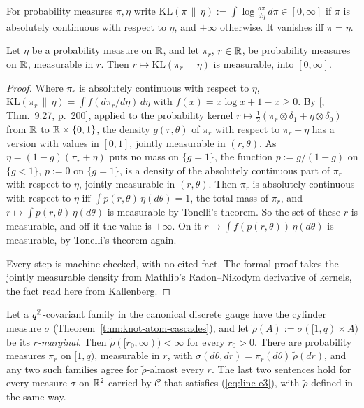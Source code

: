 For probability measures
$\pi, \eta$ write $\mathrm{KL}(\pi \,\|\, \eta) := \int\log\frac{d\pi}{d\eta}\,d\pi \in [0,\infty]$
if $\pi$ is absolutely continuous with respect to $\eta$, and $+\infty$ otherwise. It vanishes iff
$\pi = \eta$.

\begin{lemma}
\label{lem:kl-measurable}

Let $\eta$ be a probability measure on $\mathbb{R}$, and let $\pi_r$, $r \in \mathbb{R}$, be probability measures
on $\mathbb{R}$, measurable in $r$. Then $r \mapsto \mathrm{KL}(\pi_r \,\|\, \eta)$ is measurable, into
$[0,\infty]$.
\end{lemma}

\begin{proof}
Where $\pi_r$ is absolutely continuous with respect to $\eta$,
$\mathrm{KL}(\pi_r \,\|\, \eta) = \int f(d\pi_r/d\eta)\,d\eta$ with $f(x) = x\log x + 1 - x \ge 0$.
By [, Thm.~9.27, p.~200], applied to the probability kernel
$r \mapsto \tfrac12(\pi_r \otimes \delta_1 + \eta \otimes \delta_0)$ from $\mathbb{R}$ to
$\mathbb{R} \times \{0, 1\}$, the density $g(r, \theta)$ of $\pi_r$ with respect to $\pi_r + \eta$ has a
version with values in $[0, 1]$, jointly measurable in $(r, \theta)$. As
$\eta = (1 - g)(\pi_r + \eta)$ puts no mass on $\{g = 1\}$, the function $p := g/(1 - g)$ on
$\{g < 1\}$, $p := 0$ on $\{g = 1\}$, is a density of the absolutely continuous part of $\pi_r$
with respect to $\eta$, jointly measurable in $(r, \theta)$. Then $\pi_r$ is absolutely continuous with respect
to $\eta$ iff $\int p(r, \theta)\,\eta(d\theta) = 1$, the total mass of $\pi_r$, and
$r \mapsto \int p(r, \theta)\,\eta(d\theta)$ is measurable by Tonelli's theorem. So the set of these
$r$ is measurable, and off it the value is $+\infty$. On it $r \mapsto \int f(p(r, \theta))\,
\eta(d\theta)$ is measurable, by Tonelli's theorem again.

Every step is machine-checked, with no cited fact. The formal proof takes the jointly measurable
density from Mathlib's Radon--Nikodym derivative of kernels, the fact read here from Kallenberg.
\end{proof}

\begin{lemma}
\label{lem:phase-disintegration-exists}

Let a $q^{\mathbb{Z}}$-covariant family in the canonical discrete gauge have the cylinder measure $\sigma$
(Theorem~\ref{thm:knot-atom-cascades}), and let $\tilde\rho(A) := \sigma([1,q) \times A)$ be its
\emph{$r$-marginal}. Then $\tilde\rho([r_0,\infty)) < \infty$ for every $r_0 > 0$.
There are probability measures $\pi_r$ on $[1,q)$, measurable in $r$, with
$\sigma(d\theta, dr) = \pi_r(d\theta)\,\tilde\rho(dr)$, and any two such families agree for
$\tilde\rho$-almost every $r$. The last two sentences hold for every measure $\sigma$ on $\mathbb{R}^2$
carried by $\mathcal{C}$ that satisfies (\ref{eq:line-e3}), with $\tilde\rho$ defined in the same way.
\end{lemma}

